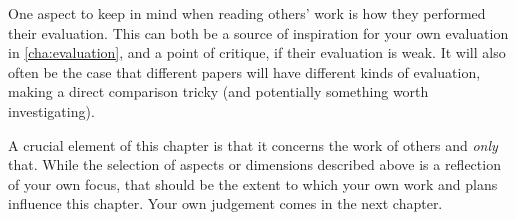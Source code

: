 One aspect to keep in mind when reading others' work is how they performed
their evaluation. This can both be a source of inspiration for your own
evaluation in \autoref{cha:evaluation}, and a point of critique, if their
evaluation is weak. It will also often be the case that different papers will
have different kinds of evaluation, making a direct comparison tricky (and
potentially something worth investigating).

A crucial element of this chapter is that it concerns the work of others and
\emph{only} that. While the selection of aspects or dimensions described
above is a reflection of your own focus, that should be the extent to which your
own work and plans influence this chapter.  Your own judgement comes in the
next chapter.

  \begin{figure}
  \centering

  

\end{figure}
